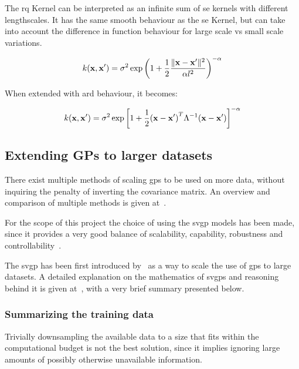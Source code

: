The \acrfull{rq} Kernel can be interpreted as an infinite sum of \acrshort{se}
kernels with different lengthscales. It has the same smooth behaviour as the
\acrlong{se} Kernel, but can take into account the difference in function
behaviour for large scale vs small scale variations.

\begin{equation}
    k(\mathbf{x}, \mathbf{x'}) = \sigma^2 \exp{\left(1+\frac{1}{2}\frac{\lVert\mathbf{x} -
    \mathbf{x'}\rVert^2}{\alpha l^2}\right)}^{-\alpha}
\end{equation}

When extended with \acrshort{ard} behaviour, it becomes:

\begin{equation}
k(\mathbf{x}, \mathbf{x'})
= \sigma^2\exp{\left[1 + \frac{1}{2} {(\mathbf{x} - \mathbf{x'})}^T \Lambda^{-1}
(\mathbf{x} - \mathbf{x'})\right]}^{-\alpha} \\
\end{equation}



\subsection{Extending GPs to larger datasets}

There exist multiple methods of scaling \acrshort{gp}s to be used on more data,
without inquiring the penalty of inverting the covariance matrix. An overview
and comparison of multiple methods is given
at~\cite{liuUnderstandingComparingScalable2019}.

For the scope of this project the choice of using the \acrfull{svgp} models has
been made, since it provides a very good balance of scalability, capability,
robustness and controllability~\cite{liuUnderstandingComparingScalable2019}.

The \acrlong{svgp} has been first introduced
by~\textcite{hensmanGaussianProcessesBig2013} as a way to scale the use of
\acrshort{gp}s to large datasets. A detailed explanation on the mathematics of
\acrshort{svgp}s and reasoning behind it is given
at~\cite{yiSparseVariationalGaussian2021}, with a very brief summary presented
below.

\subsubsection{Summarizing the training data}

Trivially downsampling the available data to a size that fits within the
computational budget is not the best solution, since it implies ignoring large
amounts of possibly otherwise unavailable information.

